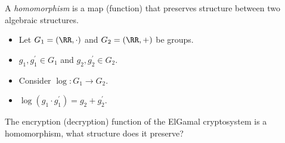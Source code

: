 \begin{frame}
  \begin{definition}[Homomorphism]
    A \emph{homomorphism} is a map (function) that preserves structure between 
    two algebraic structures.
  \end{definition}

  \pause{}

  \begin{example}
    \begin{itemize}
      \item Let \(G_1 = (\RR, \cdot)\) and \(G_2 = (\RR, +)\) be groups.
      \item \(g_1, g_1^\prime\in G_1\) and \(g_2, g_2^\prime\in G_2\).

        \pause{}

      \item Consider \(\log\colon G_1\to G_2\).
        
        \pause{}

      \item \(\log(g_1\cdot g_1^\prime) = g_2 + g_2^\prime\).
    \end{itemize}
  \end{example}
\end{frame}

\begin{frame}
  \begin{exercise}
    The encryption (decryption) function of the ElGamal cryptosystem is 
    a homomorphism, what structure does it preserve?
  \end{exercise}
\end{frame}

